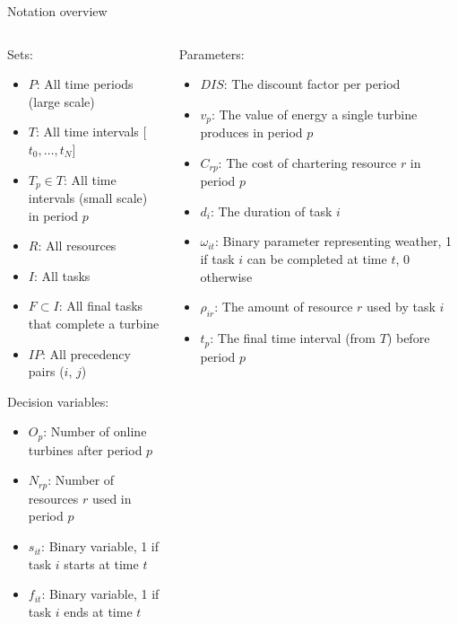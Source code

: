 \documentclass{beamer}
\begin{document}
\begin{frame}{Notation overview}
\scriptsize

\begin{columns}
\begin{column}{.48\textwidth}
Sets:
\begin{itemize}
\item $P$: All time periods (large scale)
\item $T$: All time intervals [$t_0, \dots , t_N$]
\item $T_p \in T$: All time intervals (small scale) in period $p$
\item $R$: All resources
\item $I$: All tasks
\item $F \subset I$: All final tasks that complete a turbine
\item $IP$: All precedency pairs ($i$, $j$)
\end{itemize}

Decision variables:
\begin{itemize}
\item $O_{p}$: Number of online turbines after period $p$
\item $N_{rp}$: Number of resources $r$ used in period $p$
\item $s_{it}$: Binary variable, 1 if task $i$ starts at time $t$
\item $f_{it}$: Binary variable, 1 if task $i$ ends at time $t$
\end{itemize}
\end{column}

\hfill

\begin{column}{.48\textwidth}
Parameters:
\begin{itemize}
\item $DIS$: The discount factor per period
\item $v_p$: The value of energy a single turbine produces in period $p$
\item $C_{rp}$: The cost of chartering resource $r$ in period $p$
\item $d_i$: The duration of task $i$
\item $\omega_{it}$: Binary parameter representing weather, 1 if task $i$ can be completed at time $t$, 0 otherwise
\item $\rho_{ir}$: The amount of resource $r$ used by task $i$
\item $t_p$: The final time interval (from $T$) before period $p$
\end{itemize}
\end{column}
\end{columns}

\end{frame}
\end{document}
